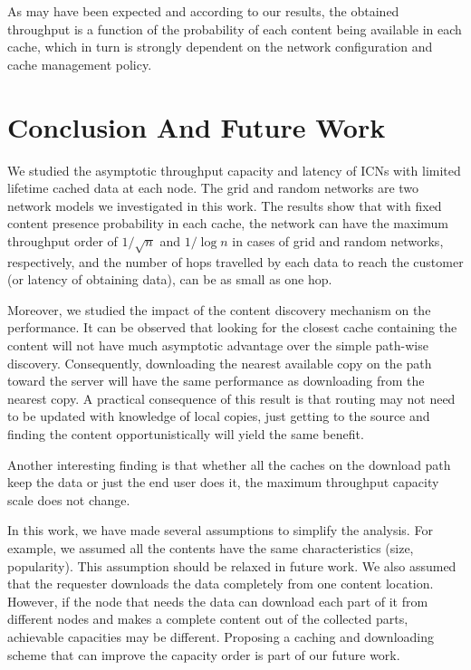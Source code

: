 \documentclass[journal]{IEEEtran}
\theoremstyle{plain}
\theoremstyle{remark}
\begin{document}
As may have been expected and according to our results, the obtained throughput is a function of the probability of each content being available in each cache, which in turn is strongly dependent on the network configuration and cache management policy. 


\section{Conclusion And Future Work}
\label{sec:conclusion}

We studied the asymptotic throughput capacity and latency of ICNs with limited lifetime cached data at each node. The grid and random networks are two network models we investigated in this work. The results show that with fixed content presence probability in each cache, the network can have the maximum throughput order of $1/\sqrt{n}$ and $1/\log n$ in cases of grid and random networks, respectively, and the number of hops travelled by each data to reach the customer (or latency of obtaining data), can be as small as one hop. 



Moreover, we studied the impact of the content discovery mechanism on the performance. It can be observed that looking for the closest cache containing the content will not have much asymptotic advantage over the simple path-wise discovery. Consequently, downloading the nearest available copy on the path toward the server will have the same performance as downloading from the nearest copy. A practical consequence of this result is that routing may not need to be updated with knowledge of local copies, just getting to the source and finding the content opportunistically will yield the same benefit. 

Another interesting finding is that whether all the caches on the download path keep the data or just the end user does it, the maximum throughput capacity scale does not change. 

In this work, we have made several assumptions to simplify the analysis. For example, we assumed all the contents have the same characteristics (size, popularity). This assumption should be relaxed in future work. We also assumed that the requester downloads the data completely from one content location. However, if the node that needs the data can download each part of it from different nodes and makes a complete content out of the collected parts, achievable capacities may be different. Proposing a caching and downloading scheme that can improve the capacity order is part of our  future work.



\end{document}
